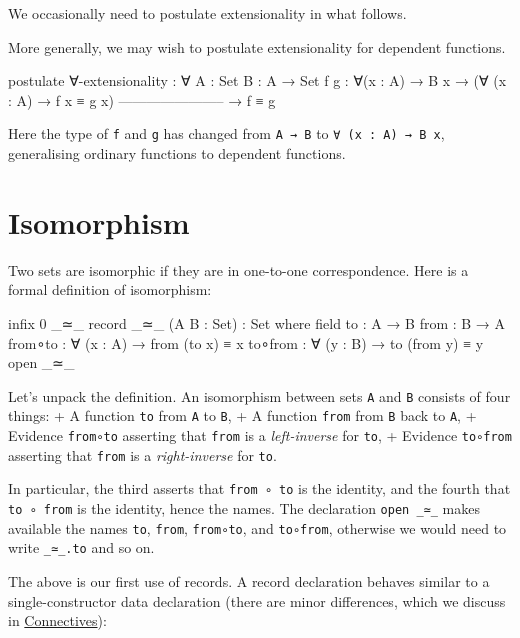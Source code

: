 We occasionally need to postulate extensionality in what follows.

More generally, we may wish to postulate extensionality for dependent
functions.

\begin{fence}
\begin{code}
postulate
  ∀-extensionality : ∀ {A : Set} {B : A → Set} {f g : ∀(x : A) → B x}
    → (∀ (x : A) → f x ≡ g x)
      -----------------------
    → f ≡ g
\end{code}
\end{fence}

Here the type of \texttt{f} and \texttt{g} has changed from
\texttt{A\ →\ B} to \texttt{∀\ (x\ :\ A)\ →\ B\ x}, generalising
ordinary functions to dependent functions.

\hypertarget{isomorphism}{%
\section{Isomorphism}\label{isomorphism}}

Two sets are isomorphic if they are in one-to-one correspondence. Here
is a formal definition of isomorphism:

\begin{fence}
\begin{code}
infix 0 _≃_
record _≃_ (A B : Set) : Set where
  field
    to   : A → B
    from : B → A
    from∘to : ∀ (x : A) → from (to x) ≡ x
    to∘from : ∀ (y : B) → to (from y) ≡ y
open _≃_
\end{code}
\end{fence}

Let's unpack the definition. An isomorphism between sets \texttt{A} and
\texttt{B} consists of four things: + A function \texttt{to} from
\texttt{A} to \texttt{B}, + A function \texttt{from} from \texttt{B}
back to \texttt{A}, + Evidence \texttt{from∘to} asserting that
\texttt{from} is a \emph{left-inverse} for \texttt{to}, + Evidence
\texttt{to∘from} asserting that \texttt{from} is a \emph{right-inverse}
for \texttt{to}.

In particular, the third asserts that \texttt{from\ ∘\ to} is the
identity, and the fourth that \texttt{to\ ∘\ from} is the identity,
hence the names. The declaration \texttt{open\ \_≃\_} makes available
the names \texttt{to}, \texttt{from}, \texttt{from∘to}, and
\texttt{to∘from}, otherwise we would need to write \texttt{\_≃\_.to} and
so on.

The above is our first use of records. A record declaration behaves
similar to a single-constructor data declaration (there are minor
differences, which we discuss in
\protect\hyperlink{Connectives}{Connectives}):

